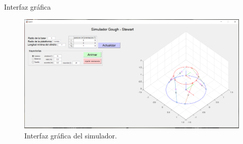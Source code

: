 \documentclass{beamer}
\begin{document}
{
\usebackgroundtemplate%
{%
}
\begin{frame}{Interfaz gráfica}
 \begin{center}
  \begin{figure}[h]
 \centering
 \includegraphics[scale=0.2]{../../04_Manual/img/principal.PNG}
 \caption{Interfaz gráfica del simulador.}
 \label{fig: GUI}
\end{figure}

 \end{center}

\end{frame}}
\end{document}
